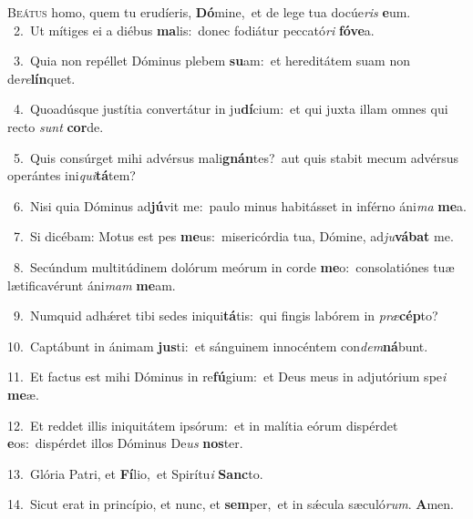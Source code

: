\lettrine{\initial\textcolor{\initialcolor}{B}}{eátus} homo, quem tu erudíeris, \textbf{Dó}\-mine,~\star et de lege tua docúe\textit{ris} \textbf{e}\-um.\\
{\numbfont\textcolor{\numbcolor}{~2.}}~Ut mítiges ei a diébus \textbf{ma}\-lis:~\star donec fodiátur peccató\textit{ri} \textbf{fó}\-\textbf{ve}a.\par
{\numbfont\textcolor{\numbcolor}{~3.}}~Quia non repéllet Dóminus plebem \textbf{su}\-am:~\star et hereditátem suam non de\-\textit{re}\-\textbf{lín}quet.\par
{\numbfont\textcolor{\numbcolor}{~4.}}~Quoadúsque justítia convertátur in ju\-\textbf{dí}\-cium:~\star et qui juxta illam omnes qui recto \textit{sunt} \textbf{cor}\-de.\par
{\numbfont\textcolor{\numbcolor}{~5.}}~Quis consúrget mihi advérsus mali\-\textbf{gnán}\-tes?~\star aut quis stabit mecum advérsus operántes ini\-\textit{qui}\-\textbf{tá}tem?\par
{\numbfont\textcolor{\numbcolor}{~6.}}~Nisi quia Dóminus ad\-\textbf{jú}\-vit me:~\star paulo minus habitásset in inférno áni\textit{ma} \textbf{me}\-a.\par
{\numbfont\textcolor{\numbcolor}{~7.}}~Si dicébam: Motus est pes \textbf{me}\-us:~\star misericórdia tua, Dómine, ad\-\textit{ju}\-\textbf{vá}\textbf{bat} me.\par
{\numbfont\textcolor{\numbcolor}{~8.}}~Secúndum multitúdinem dolórum meórum in corde \textbf{me}\-o:~\star consolatiónes tuæ lætificavérunt áni\textit{mam} \textbf{me}\-am.\par
{\numbfont\textcolor{\numbcolor}{~9.}}~Numquid adhǽret tibi sedes iniqui\-\textbf{tá}\-tis:~\star qui fingis labórem in \textit{præ}\-\textbf{cép}to?\par
{\numbfont\textcolor{\numbcolor}{10.}}~Captábunt in ánimam \textbf{jus}\-ti:~\star et sánguinem innocéntem con\-\textit{dem}\-\textbf{ná}bunt.\par
{\numbfont\textcolor{\numbcolor}{11.}}~Et factus est mihi Dóminus in re\-\textbf{fú}\-gium:~\star et Deus meus in adjutórium spe\textit{i} \textbf{me}\-æ.\par
{\numbfont\textcolor{\numbcolor}{12.}}~Et reddet illis iniquitátem ipsórum:~\dagger et in malítia eórum dispérdet \textbf{e}\-os:~\star dispérdet illos Dóminus De\textit{us} \textbf{nos}\-ter.\par
{\numbfont\textcolor{\numbcolor}{13.}}~Glória Patri, et \textbf{Fí}\-lio,~\star et Spirítu\textit{i} \textbf{Sanc}\-to.\par
{\numbfont\textcolor{\numbcolor}{14.}}~Sicut erat in princípio, et nunc, et \textbf{sem}\-per,~\star et in sǽcula sæculó\-\textit{rum}\-. \textbf{A}\-men.\par
